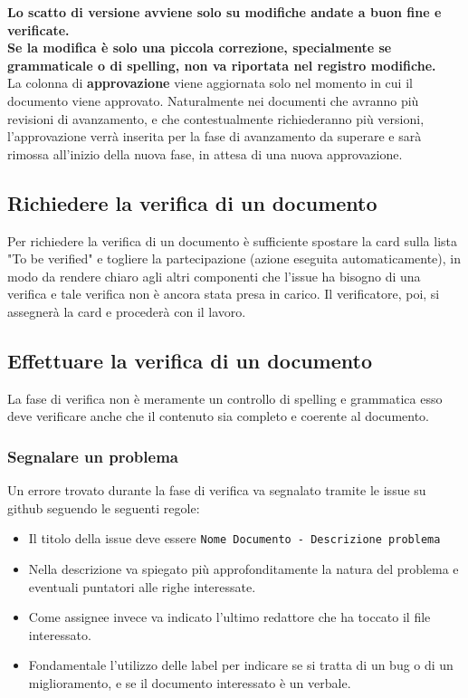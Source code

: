 \noindent
\textbf{Lo scatto di versione avviene solo su modifiche andate a buon fine e verificate.}
\\

\noindent
\textbf{Se la modifica è solo una piccola correzione, specialmente se grammaticale o di
spelling, non va riportata nel registro modifiche.}\\


\noindent
La colonna di \textbf{approvazione} viene aggiornata solo nel momento in cui il documento viene approvato. Naturalmente nei documenti che avranno più revisioni di avanzamento, e che contestualmente richiederanno più versioni, l'approvazione verrà inserita per la fase di avanzamento da superare e sarà rimossa all'inizio della nuova fase, in attesa di una nuova approvazione.

\subsection{Richiedere la verifica di un documento}
Per richiedere la verifica di un documento è sufficiente spostare la card sulla lista "To be verified" e togliere la partecipazione (azione eseguita automaticamente), in modo da rendere chiaro agli altri componenti che l'issue ha bisogno di una verifica e tale verifica non è ancora stata presa in carico. Il verificatore, poi, si assegnerà la card e procederà con il lavoro.

\subsection{Effettuare la verifica di un documento}
La fase di verifica non è meramente un controllo di spelling e grammatica esso
deve verificare anche che il contenuto sia completo e coerente al documento.

\subsubsection{Segnalare un problema}
Un errore trovato durante la fase di verifica va segnalato tramite le issue su github
seguendo le seguenti regole:
\begin{itemize}
    \item Il titolo della issue deve essere
    \texttt{Nome Documento - Descrizione problema}
    \item Nella descrizione va spiegato più approfonditamente la natura del
    problema e eventuali puntatori alle righe interessate.
    \item  Come assignee invece va indicato l'ultimo redattore che ha toccato il file
    interessato.
    \item Fondamentale l'utilizzo delle label per indicare se si tratta
    di un bug o di un miglioramento, e se il documento interessato è un verbale.
\end{itemize}

